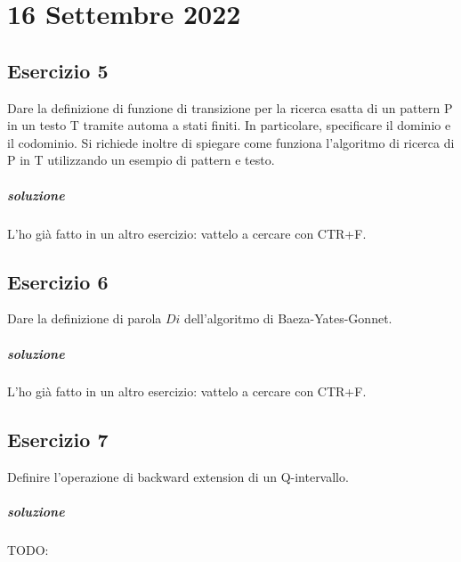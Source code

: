 \chapter{16 Settembre 2022}

\section{Esercizio 5}

Dare la definizione di funzione di transizione per la ricerca esatta di un pattern P in un testo T tramite automa a stati finiti. In particolare, specificare il dominio e il codominio.
Si richiede inoltre di spiegare come funziona l'algoritmo di ricerca di P in T utilizzando un esempio di pattern e testo.

\paragraph{soluzione} L'ho gi\`a fatto in un altro esercizio: vattelo a cercare con CTR+F.

\section{Esercizio 6}

Dare la definizione di parola $Di$ dell'algoritmo di Baeza-Yates-Gonnet.

\paragraph{soluzione} L'ho gi\`a fatto in un altro esercizio: vattelo a cercare con CTR+F.

\section{Esercizio 7}

Definire l'operazione di backward extension di un Q-intervallo.

\paragraph{soluzione} TODO:
